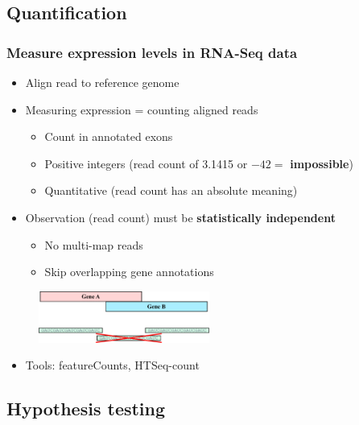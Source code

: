 \documentclass{beamer}			  %
\begin{document}
\subsection{Quantification}
\begin{frame}
	\frametitle{Measure expression levels in RNA-Seq data}
	\begin{itemize}
			\item Align read to reference genome
		\item Measuring expression = counting aligned reads
		\begin{itemize}
				\item Count in annotated exons
			\item Positive integers (read count of 3.1415 or $-42 = $ \textbf{impossible})
			\item Quantitative (read count has an absolute meaning)
		\end{itemize}
		\item Observation (read count) must be \textbf{statistically independent}
		\begin{itemize}
			\item No multi-map reads
			\item Skip overlapping gene annotations
		\end{itemize}
	\end{itemize}
	
	\begin{figure}
		\includegraphics[width=0.5\textwidth]{figures/dge_09p.pdf}
	\end{figure}
	\begin{itemize}
		\item Tools: featureCounts, HTSeq-count \cite{featurecounts,htseq}
	\end{itemize}
\end{frame}


\subsection{Hypothesis testing}
\end{document}
